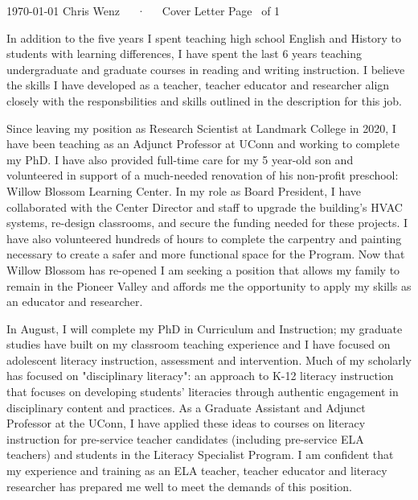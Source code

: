 \documentclass[11pt, a4paper]{awesome-cv}
\begin{document}
\makecvheader[C]

\makecvfooter
  {\today}
  {Chris Wenz~~~·~~~Cover Letter}
  {Page \thepage\ of 1}
\makelettertitle

\begin{cvletter}

In addition to the five years I spent teaching high school English and History to students with learning differences, I have spent the last 6 years teaching undergraduate and graduate courses in reading and writing instruction. I believe the skills I have developed as a teacher, teacher educator and researcher align closely with the responsbilities and skills outlined in the description for this job. 

Since leaving my position as Research Scientist at Landmark College in 2020, I have been teaching as an Adjunct Professor at UConn and working to complete my PhD. I have also provided full-time care for my 5 year-old son and volunteered in support of a much-needed renovation of his non-profit preschool: Willow Blossom Learning Center. In my role as Board President, I have collaborated with the Center Director and staff to upgrade the building's HVAC systems, re-design classrooms, and secure the funding needed for these projects. I have also volunteered hundreds of hours to complete the carpentry and painting necessary to create a safer and more functional space for the Program. Now that Willow Blossom has re-opened I am seeking a position that allows my family to remain in the Pioneer Valley and affords me the opportunity to apply my skills as an educator and researcher. 

In August, I will complete my PhD in Curriculum and Instruction; my graduate studies have built on my classroom teaching experience and I have focused on adolescent literacy instruction, assessment and intervention. Much of my scholarly has focused on "disciplinary literacy": an approach to K-12 literacy instruction that focuses on developing students' literacies through authentic engagement in disciplinary content and practices. As a Graduate Assistant and Adjunct Professor at the UConn, I have applied these ideas to courses on literacy instruction for pre-service teacher candidates (including pre-service ELA teachers) and students in the Literacy Specialist Program. I am confident that my experience and training as an ELA teacher, teacher educator and literacy researcher has prepared me well to meet the demands of this position. 


\end{cvletter}
\end{document}
